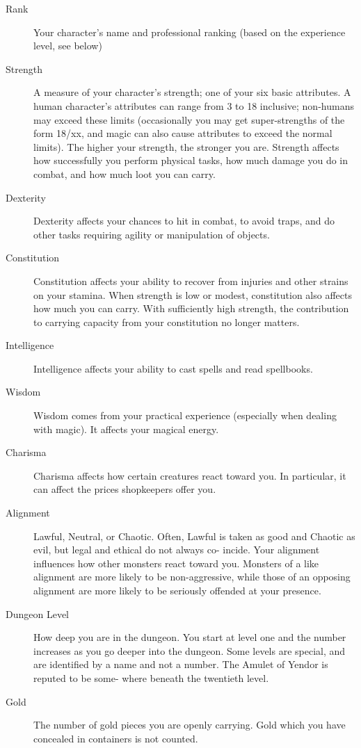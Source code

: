\documentclass[11pt]{article}
\begin{document}
\begin{description}
\item[{Rank}] Your character's name and professional ranking (based on
the experience level, see below)

\item[{Strength}] A measure of your character's strength; one of your six
basic  attributes.   A  human character's attributes can range from
3 to 18 inclusive; non-humans may exceed  these  limits
(occasionally you may get super-strengths of the form 18/xx, and
magic can also cause attributes  to  exceed  the  normal limits).
The  higher  your strength, the stronger you are. Strength  affects
how  successfully  you  perform  physical tasks,  how  much damage
you do in combat, and how much loot you can carry.

\item[{Dexterity}] Dexterity affects your chances to hit in  combat,  to
avoid traps,  and do other tasks requiring agility or manipulation
of objects.

\item[{Constitution}] Constitution affects your ability to recover  from
injuries and  other strains on your stamina.  When strength is low
or modest, constitution also affects how much  you  can  carry. With
sufficiently high strength, the contribution to carrying capacity
from your constitution no longer matters.

\item[{Intelligence}] Intelligence affects your ability to cast  spells
and  read spellbooks.

\item[{Wisdom}] Wisdom comes from your practical experience (especially
when dealing with magic).  It affects your magical energy.

\item[{Charisma}] Charisma affects how certain creatures react toward you.
In particular, it can affect the prices shopkeepers offer you.

\item[{Alignment}] Lawful, Neutral, or Chaotic.  Often, Lawful is taken as
good and Chaotic as evil, but legal and ethical do not always co-
incide.   Your alignment influences how other monsters react toward
you.  Monsters of a like alignment are more likely to be
non-aggressive, while those of an opposing alignment are more likely
to be seriously offended at your presence.

\item[{Dungeon Level}] How deep you are in the dungeon.  You start at
level one and the  number  increases  as  you  go deeper into the
dungeon. Some levels are special, and are identified by  a  name
and not  a  number.  The Amulet of Yendor is reputed to be some-
where beneath the twentieth level.

\item[{Gold}] The number of gold pieces you  are  openly  carrying.   Gold
which you have concealed in containers is not counted.
\end{description}
\end{document}
